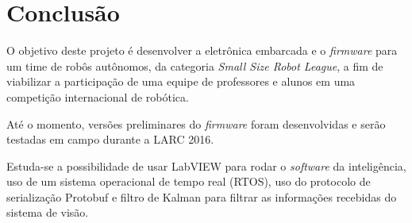 \chapter{Conclusão}\label{cap:conclusao}

%
%
%
%


O objetivo deste projeto é desenvolver a eletrônica embarcada e o \textit{firmware} para um time de robôs autônomos, da categoria \textit{Small Size Robot League}, a fim de viabilizar a participação de uma equipe de professores e alunos em uma competição internacional de robótica.

Até o momento, versões preliminares do \textit{firmware} foram desenvolvidas e serão testadas em campo durante a LARC 2016.

Estuda-se a possibilidade de usar LabVIEW\textsuperscript{\texttrademark} para rodar o \textit{software} da inteligência, uso de um sistema operacional de tempo real (RTOS), uso do protocolo de serialização Protobuf\cite{protobufdocs} e filtro de Kalman para filtrar as informações recebidas do sistema de visão. 

